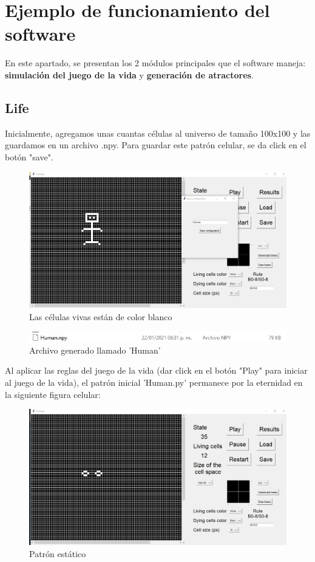 \documentclass[12pt,a4paper]{book}
\begin{document}
	\section{Ejemplo de funcionamiento del software}
	En este apartado, se presentan los 2 módulos principales que el software maneja: \textbf{simulación del juego de la vida} y \textbf{generación de atractores}.
	\subsection{Life}
	Inicialmente, agregamos unas cuantas células al universo de tamaño 100x100 y las guardamos en un archivo .npy. Para guardar este patrón celular, se da click en el botón "save".
	\begin{figure}[H]
		\centering
		\includegraphics[width=1\textwidth]{imagen7PC}
		\caption{Las células vivas están de color blanco}
	\end{figure}
	\begin{figure}[H]
		\centering
		\includegraphics[width=1\textwidth]{imagen8PC}
		\caption{Archivo generado llamado 'Human'}
	\end{figure}
	Al aplicar las reglas del juego de la vida (dar click en el botón "Play" para iniciar al juego de la vida), el patrón inicial 'Human.py' permanece por la eternidad en la siguiente figura celular:
	\begin{figure}[H]
		\centering
		\includegraphics[width=1\textwidth]{imagen9PC}
		\caption{Patrón estático}
	\end{figure}
\end{document}

